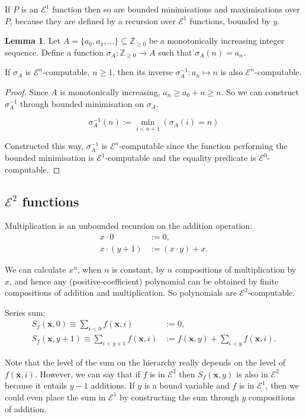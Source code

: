 \documentclass[a4paper]{article}
\newcommand{\grz}[1]{$\mathcal{E}^{#1}$}	%
\newcommand{\ZZ}{\mathbb{Z}}
\newcommand{\xvec}{\mathbf{x}}	%
\newcommand{\recur}[1]{\begin{equation} \begin{split} #1 \end{split} \end{equation}}	%
\theoremstyle{plain}
\theoremstyle{definition}
\newtheorem{lemma}[theorem]{Lemma}
\begin{document}
If $P$ is an \grz{1} function then so are bounded minimisations and maximisations over $P$, because they are defined by a recursion over \grz{1} functions, bounded by $y$.

\begin{lemma}
	Let $A = \{a_0, a_1, \dots\} \subseteq \ZZ_{\geq 0}$ be a monotonically increasing integer sequence. Define a function $\sigma_A : \ZZ_{\geq 0} \to A$ such that $\sigma_A(n) = a_n$.
	
	If $\sigma_A$ is \grz{n}-computable, $n \geq 1$, then its inverse $\sigma_A^{-1} : a_n \mapsto n$ is also \grz{n}-computable.
\end{lemma}
\begin{proof}
	Since $A$ is monotonically increasing, $a_n \geq a_0 + n \geq n$. So we can construct $\sigma_A^{-1}$ through bounded minimisation on $\sigma_A$.

	\[ \sigma_A^{-1}(n) := \min_{i < n+1}{\left( \sigma_A(i) = n \right)} \]

	Constructed this way, $\sigma_A^{-1}$ is \grz{n}-computable since the function performing the bounded minimisation is \grz{1}-computable and the equality predicate is \grz{0}-computable.
\end{proof}

\subsection{\grz{2} functions}
Multiplication is an unbounded recursion on the addition operation:
\recur{
	x \cdot 0 &:= 0,				\\
	x \cdot (y+1) &:= (x \cdot y) + x.
}

We can calculate $x^n$, when $n$ is constant, by $n$ compositions of multiplication by $x$, and hence any (positive-coefficient) polynomial can be obtained by finite compositions of addition and multiplication. So polynomials are \grz{2}-computable.

Series sum:
\recur{
	S_f(\xvec,0) \equiv \sum_{i < 0} f(\xvec, i) &:= 0,		\\
	S_f(\xvec,y+1) \equiv \sum_{i < y+1} f(\xvec,i) &:= f(\xvec,y) + \sum_{i < y} f(\xvec,i).
}

Note that the level of the sum on the hierarchy really depends on the level of $f(\xvec,i)$. However, we can say that if $f$ is in \grz{2} then $S_f(\xvec,y)$ is also in \grz{2} because it entails $y-1$ additions. If $y$ is a bound variable and $f$ is in \grz{1}, then we could even place the sum in \grz{1} by constructing the sum through $y$ compositions of addition.
\end{document}
